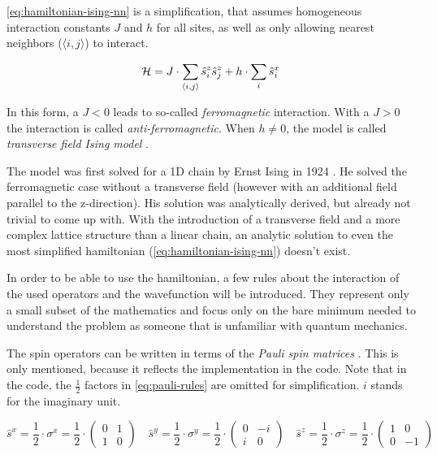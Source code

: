 \autoref{eq:hamiltonian-ising-nn} is a simplification, that assumes homogeneous interaction constants $J$ and $h$ for all sites, as well as only allowing nearest neighbors ($\langle i, j\rangle$) to interact.

\begin{equation}
    \label{eq:hamiltonian-ising-nn}
    \mathcal{H} =  J \cdot \sum\limits_{\langle i, j \rangle} \hat{s}^z_i \hat{s}^z_j + h \cdot \sum\limits_{i} \hat{s}^x_i
\end{equation}

In this form, a $J < 0$ leads to so-called \emph{ferromagnetic} interaction. With a $J > 0$ the interaction is called \emph{anti-ferromagnetic}. When $h \neq 0$, the model is called \emph{transverse field Ising model} \cite{isingBook}.

The model was first solved for a 1D chain by Ernst Ising in 1924 \cite*[]{isingFerromagnetismn}. He solved the ferromagnetic case without a transverse field (however with an additional field parallel to the z-direction). His solution was analytically derived, but already not trivial to come up with.
With the introduction of a transverse field and a more complex lattice structure than a linear chain, an analytic solution to even the most simplified hamiltonian (\autoref{eq:hamiltonian-ising-nn}) doesn't exist.

In order to be able to use the hamiltonian, a few rules about the interaction of the used operators and the wavefunction will be introduced. They represent only a small subset of the mathematics and focus only on the bare minimum needed to understand the problem as someone that is unfamiliar with quantum mechanics. 

The spin operators can be written in terms of the \emph{Pauli spin matrices} \cite{schwablQM}. This is only mentioned, because it reflects the implementation in the code. Note that in the code, the $\frac{1}{2}$ factors in \autoref{eq:pauli-rules} are omitted for simplification. $i$ stands for the imaginary unit.

\begin{equation}
    \label{eq:pauli-rules}
    \hat{s}^x = \frac{1}{2} \cdot \sigma^x = \frac{1}{2} \cdot \left(\begin{matrix}
        0& 1 \\
        1& 0
    \end{matrix}\right) \quad
    \hat{s}^y = \frac{1}{2} \cdot \sigma^y = \frac{1}{2} \cdot \left(\begin{matrix}
        0& -i \\
        i& 0
    \end{matrix}\right) \quad
    \hat{s}^z = \frac{1}{2} \cdot \sigma^z = \frac{1}{2} \cdot \left(\begin{matrix}
        1& 0 \\
        0& -1
    \end{matrix}\right)
\end{equation}

